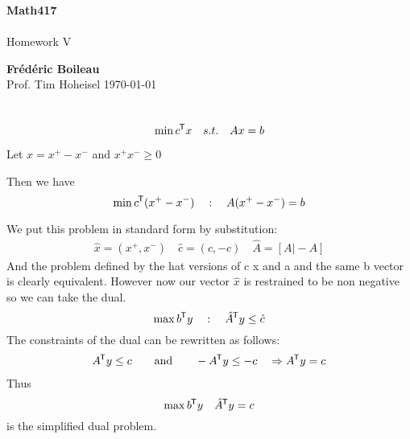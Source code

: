 \documentclass{article}
\newcommand*{\tran}{^{\mkern-1.5mu\mathsf{T}}}%
\begin{document}
	\begin{titlepage}
		\begin{center}
			\vspace*{1cm}
			\textbf{Math417}\\
			\\
			\vspace{0.5cm}
			Homework V
			
			\vspace{1.5cm}
			
			\textbf{Frédéric Boileau}\\
			\vspace{2cm}
			Prof. 
			Tim Hoheisel
			\vfill
			\today
			\thispagestyle{empty}
		\end{center}
	\end{titlepage}
	\newpage
	\tableofcontents
	\thispagestyle{empty}
	\clearpage

	\section{}
	
	\begin{equation}
		\min c\tran x \quad s.t. \quad Ax=b
	\end{equation}
	
		Let $x = x^+ - x^-$ and $x^+ x^- \geq 0$
		
		Then we have
		\begin{equation}
		\min c\tran (x^+-x^-) \quad : \quad A(x^+-x^-) = b
		\end{equation}
		
		We put this problem in standard form by substitution:
		\begin{align*}
		\hat x = (x^+ , x ^-) \quad \hat c = (c, -c) \quad \hat A = [A \vert -A]
		\end{align*}	
		And the problem defined by the hat versions of c x and a and the same b vector is clearly equivalent. However now our vector $\hat x$ is restrained to be non negative so we can take the dual.
		\begin{equation}
		\max b\tran y \quad : \quad \hat A\tran  y \leq \hat c
		\end{equation}
		The constraints of the dual can be rewritten as follows:
		\begin{align*}
		A\tran y \leq c \qquad \text{and}\qquad -A\tran y  \leq -c  \quad \Rightarrow A\tran y = c\\ 
		\end{align*}
		Thus 
		\begin{equation}
			\max b\tran y \quad \hat A \tran y = c
		\end{equation}
		is the simplified dual problem.
		
\end{document}
